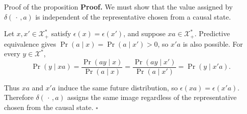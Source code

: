 \documentclass[aspectratio=169,12pt,t]{beamer}
\begin{document}
\begin{frame}{Proof of the proposition}
  \setlength{\parskip}{0pt}
  \vfill
  \textbf{Proof.} We must show that the value assigned by
  $\delta(\,\cdot\,,a)$ is independent of the representative chosen from a
  causal state.\par\vspace{2mm}
  Let $x,x'\in\mathcal X^*_+$ satisfy
  $\epsilon(x)=\epsilon(x')$, and suppose $xa\in\mathcal X^*_+$.
  Predictive equivalence gives
  $\Pr(a\mid x)=\Pr(a\mid x')>0$, so $x'a$ is also possible. For every
  $y\in\mathcal X^*$,
  \[
    \Pr(y\mid xa)
      =\frac{\Pr(ay\mid x)}{\Pr(a\mid x)}
      =\frac{\Pr(ay\mid x')}{\Pr(a\mid x')}
      =\Pr(y\mid x'a).
  \]

  \vfill
  Thus $xa$ and $x'a$ induce the same future distribution, so
  $\epsilon(xa)=\epsilon(x'a)$. Therefore $\delta(\,\cdot\,,a)$ assigns the
  same image regardless of the representative chosen from the causal state.
  \hfill$\square$
  \vfill

\end{frame}
\end{document}
